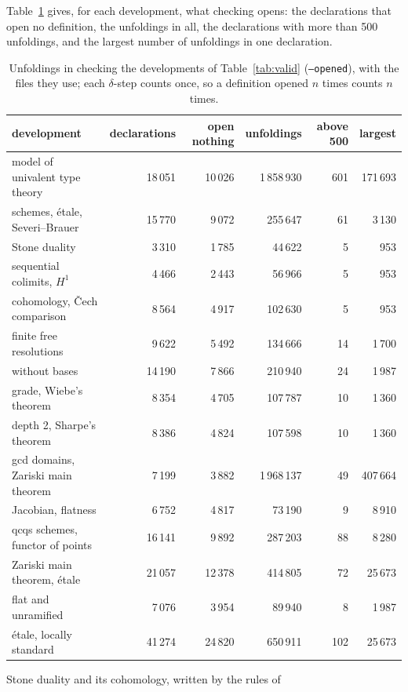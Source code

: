 \documentclass[11pt]{article}
\newcommand{\kw}[1]{\texttt{#1}}
\begin{document}
Table~\ref{tab:totals} gives, for each development, what checking
opens: the declarations that open no definition, the unfoldings in
all, the declarations with more than 500 unfoldings, and the largest
number of unfoldings in one declaration.
\begin{table}[ht]
\centering
\small
\setlength{\tabcolsep}{4pt}
\begin{tabular}{lrrrrr}
\toprule
development & declarations & open nothing & unfoldings & above 500 & largest\\
\midrule
model of univalent type theory & 18\,051 & 10\,026 & 1\,858\,930 & 601 & 171\,693\\
schemes, \'etale, Severi--Brauer & 15\,770 & 9\,072 & 255\,647 & 61 & 3\,130\\
Stone duality & 3\,310 & 1\,785 & 44\,622 & 5 & 953\\
sequential colimits, $H^1$ & 4\,466 & 2\,443 & 56\,966 & 5 & 953\\
cohomology, \v{C}ech comparison & 8\,564 & 4\,917 & 102\,630 & 5 & 953\\
finite free resolutions & 9\,622 & 5\,492 & 134\,666 & 14 & 1\,700\\
\quad without bases & 14\,190 & 7\,866 & 210\,940 & 24 & 1\,987\\
grade, Wiebe's theorem & 8\,354 & 4\,705 & 107\,787 & 10 & 1\,360\\
depth 2, Sharpe's theorem & 8\,386 & 4\,824 & 107\,598 & 10 & 1\,360\\
gcd domains, Zariski main theorem & 7\,199 & 3\,882 & 1\,968\,137 & 49 & 407\,664\\
Jacobian, flatness & 6\,752 & 4\,817 & 73\,190 & 9 & 8\,910\\
qcqs schemes, functor of points & 16\,141 & 9\,892 & 287\,203 & 88 & 8\,280\\
Zariski main theorem, \'etale & 21\,057 & 12\,378 & 414\,805 & 72 & 25\,673\\
flat and unramified & 7\,076 & 3\,954 & 89\,940 & 8 & 1\,987\\
\'etale, locally standard & 41\,274 & 24\,820 & 650\,911 & 102 & 25\,673\\
\bottomrule
\end{tabular}
\caption{Unfoldings in checking the developments of
  Table~\ref{tab:valid} (\kw{--opened}), with the files they use;
  each $\delta$-step counts once, so a definition opened $n$ times
  counts $n$ times.}
\label{tab:totals}
\end{table}
Stone duality and its cohomology, written by the rules of
\end{document}
